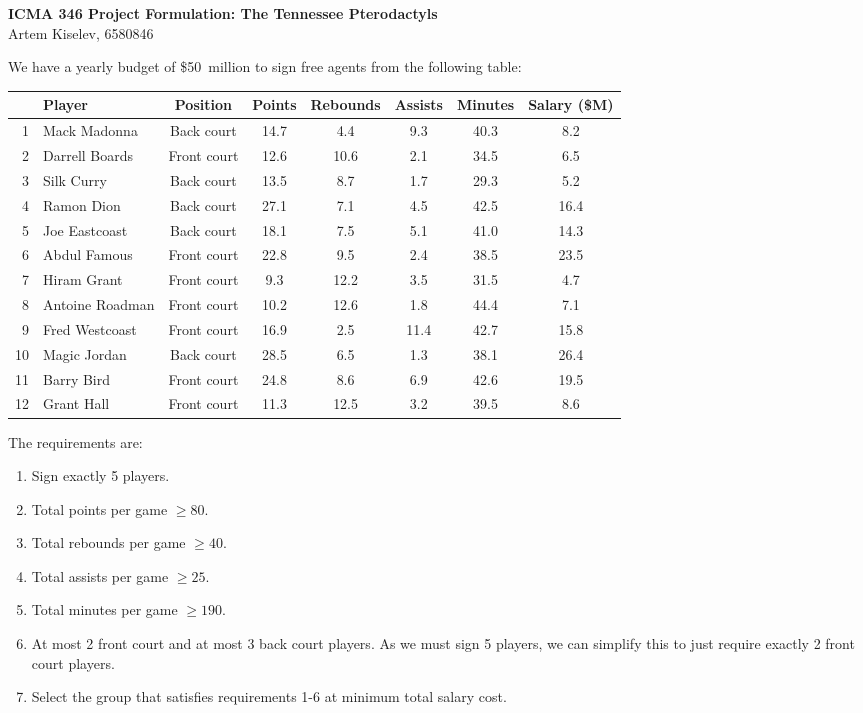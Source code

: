 \documentclass[a4paper,11pt]{article}
\begin{document}
{\Large \textbf{ICMA 346 Project Formulation: The Tennessee Pterodactyls}}\\
{\normalsize Artem Kiselev, 6580846}

\vspace{1em}
We have a yearly budget of \$50~million to sign free agents from the following table:

\begin{table}[htbp]
\centering
\renewcommand{\arraystretch}{1}
\begin{tabular}{rlcccccc}
\hline
& \textbf{Player} & \textbf{Position} & \textbf{Points} & \textbf{Rebounds} & \textbf{Assists} & \textbf{Minutes} & \textbf{Salary (\$M)} \\
\hline
1  & Mack Madonna        & Back court  & 14.7 & 4.4  & 9.3 & 40.3 & 8.2  \\
2  & Darrell Boards      & Front court & 12.6 & 10.6 & 2.1 & 34.5 & 6.5  \\
3  & Silk Curry          & Back court  & 13.5 & 8.7  & 1.7 & 29.3 & 5.2  \\
4  & Ramon Dion          & Back court  & 27.1 & 7.1  & 4.5 & 42.5 & 16.4 \\
5  & Joe Eastcoast       & Back court  & 18.1 & 7.5  & 5.1 & 41.0 & 14.3 \\
6  & Abdul Famous        & Front court & 22.8 & 9.5  & 2.4 & 38.5 & 23.5 \\
7  & Hiram Grant         & Front court & 9.3  & 12.2 & 3.5 & 31.5 & 4.7  \\
8  & Antoine Roadman     & Front court & 10.2 & 12.6 & 1.8 & 44.4 & 7.1  \\
9  & Fred Westcoast      & Front court & 16.9 & 2.5  & 11.4 & 42.7 & 15.8 \\
10 & Magic Jordan        & Back court  & 28.5 & 6.5  & 1.3 & 38.1 & 26.4 \\
11 & Barry Bird          & Front court & 24.8 & 8.6  & 6.9 & 42.6 & 19.5 \\
12 & Grant Hall          & Front court & 11.3 & 12.5 & 3.2 & 39.5 & 8.6  \\
\hline
\end{tabular}
\end{table}

\vspace{-0.5em}
The requirements are:
\begin{enumerate}
  \item Sign exactly 5 players.
  \item Total points per game $\ge80$.
  \item Total rebounds per game $\ge40$.
  \item Total assists per game $\ge25$.
  \item Total minutes per game $\ge190$.
  \item At most 2 front court and at most 3 back court players. As we must sign 5 players, we can simplify this to just require exactly 2 front court players.
  \item Select the group that satisfies requirements 1-6 at minimum total salary cost.
\end{enumerate}
\end{document}

